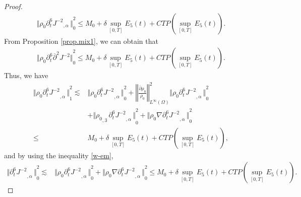 \documentclass[12pt,twoside,reqno]{amsart}
\numberwithin{equation}{section}
\theoremstyle{definition}
\theoremstyle{remark}
\begin{document}
\begin{proof}
\begin{align*}
  {\Vert{{\rho_0}  {\partial}_t^6{{{J^{-2}}}_{,{\alpha}}\,}}\Vert}_0^2{\leqslant} M_0+\delta \sup_{[0,T]} E_5(t)+CTP(\sup_{[0,T]}E_5(t)).
\end{align*}
From Proposition \ref{prop.mix1}, we can obtain that
\begin{align*}
  {\Vert{{\rho_0}  {\partial}_t^6{\overline{\partial}}^2 J^{-2}}\Vert}_0^2{\leqslant} M_0+\delta \sup_{[0,T]} E_5(t)+CTP(\sup_{[0,T]}E_5(t)).
\end{align*}
Thus, we have
\begin{align*}
  {\Vert{{\rho_0} {{{{\partial}_t^6 J^{-2}}}_{,{\alpha}}\,}}\Vert}_1^2\lesssim &{\Vert{{\rho_0} {{{{\partial}_t^6 J^{-2}}}_{,{\alpha}}\,}}\Vert}_0^2+{\left\Vert{\frac{{\overline{\partial}}{\rho_0}}{\rho_0}}\right\Vert}_{L^\infty(\Omega)}^2 {\Vert{{\rho_0} {{{{\partial}_t^6 J^{-2}}}_{,{\alpha}}\,}}\Vert}_0^2\\
  &+{\Vert{{{\rho_0}_{,{3}}\,} {{{{\partial}_t^6 J^{-2}}}_{,{\alpha}}\,}}\Vert}_0^2+{\Vert{{\rho_0} {\nabla}{{{{\partial}_t^6 J^{-2}}}_{,{\alpha}}\,}}\Vert}_0^2\\
  {\leqslant}&M_0+\delta \sup_{[0,T]} E_5(t)+CTP(\sup_{[0,T]}E_5(t)),
\end{align*}
and by using the inequality \eqref{w-em},
\begin{align*}
  {\Vert{{{{{\partial}_t^6 J^{-2}}}_{,{\alpha}}\,}}\Vert}_0^2\lesssim & {\Vert{{\rho_0} {{{{\partial}_t^6 J^{-2}}}_{,{\alpha}}\,}}\Vert}_0^2+{\Vert{{\rho_0} {\nabla}{{{{\partial}_t^6 J^{-2}}}_{,{\alpha}}\,}}\Vert}_0^2
  {\leqslant} M_0+\delta \sup_{[0,T]} E_5(t)+CTP(\sup_{[0,T]}E_5(t)).
\end{align*}


\end{proof}
\end{document}
